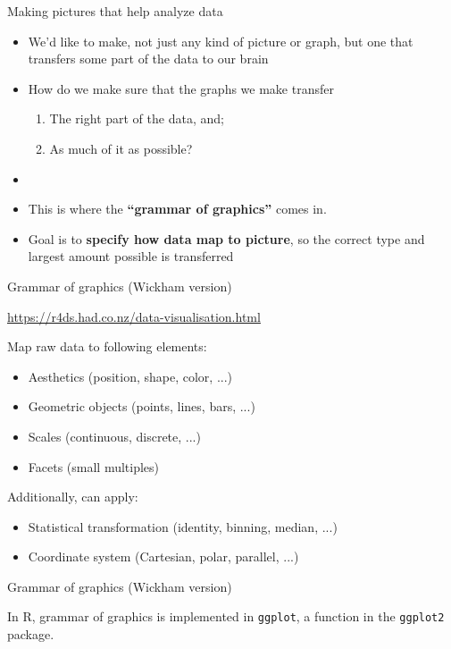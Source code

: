 \documentclass[xcolor=table,aspectratio=169]{beamer}
\begin{document}
\begin{frame}
  {Making pictures that help analyze data}

  \begin{itemize}
  \item We'd like to make, not just any kind of picture or graph, but one that transfers some part of the data to our brain
  \item How do we make sure that the graphs we make transfer
    \begin{enumerate}
    \item The right part of the data, and;
      \item As much of it as possible?
      \end{enumerate}
    \item[]
    \item[] This is where the \textbf{``grammar of graphics''} comes in.
      \item[] Goal is to \textbf{specify how data map to picture}, so the correct type and largest amount possible is transferred
  \end{itemize}
  \end{frame}

\begin{frame}
  {Grammar of graphics (Wickham version)}

  \url{https://r4ds.had.co.nz/data-visualisation.html}
  \bigskip
  
  Map raw data to following elements:
  
  \begin{itemize}
    \item Aesthetics (position, shape, color, ...)
    \item Geometric objects (points, lines, bars, ...)
    \item Scales (continuous, discrete, ...)
    \item Facets (small multiples)
  \end{itemize}

  Additionally, can apply:

  \begin{itemize}
    \item Statistical transformation (identity, binning, median, ...)
    \item Coordinate system (Cartesian, polar, parallel, ...)
  \end{itemize}
\end{frame}
\begin{frame}
  {Grammar of graphics (Wickham version)}

  
  In R, grammar of graphics is implemented in \texttt{ggplot}, a function in the \texttt{ggplot2} package.
  
  
  
\end{frame}
\end{document}
